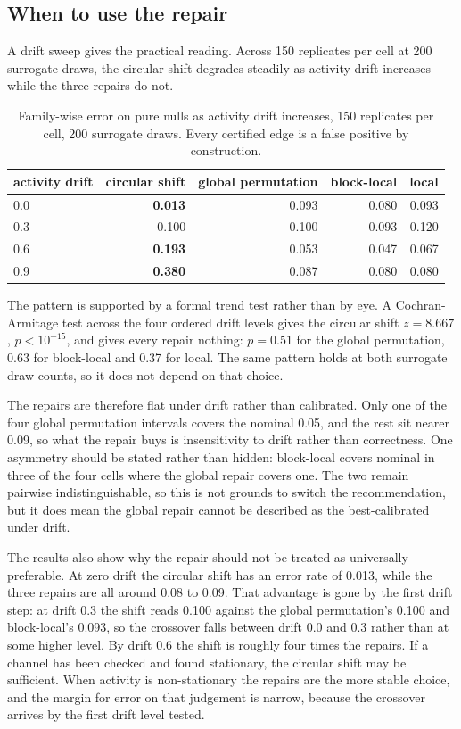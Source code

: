 \documentclass[10pt]{article}
\begin{document}
\subsection{When to use the repair}

A drift sweep gives the practical reading. Across 150 replicates per cell at 200 surrogate draws,
the circular shift degrades steadily as activity drift increases while the three repairs do not.

\begin{table}[h]
\centering
\begin{tabular}{lrrrr}
\toprule
activity drift & circular shift & global permutation & block-local & local \\
\midrule
0.0 & \textbf{0.013} & 0.093 & 0.080 & 0.093 \\
0.3 & 0.100 & 0.100 & 0.093 & 0.120 \\
0.6 & \textbf{0.193} & 0.053 & 0.047 & 0.067 \\
0.9 & \textbf{0.380} & 0.087 & 0.080 & 0.080 \\
\bottomrule
\end{tabular}
\caption{Family-wise error on pure nulls as activity drift increases, 150 replicates per cell, 200
surrogate draws. Every certified edge is a false positive by construction.}
\end{table}

The pattern is supported by a formal trend test rather than by eye. A Cochran-Armitage test across
the four ordered drift levels gives the circular shift $z = 8.667$, $p < 10^{-15}$, and gives every
repair nothing: $p = 0.51$ for the global permutation, 0.63 for block-local and 0.37 for local. The
same pattern holds at both surrogate draw counts, so it does not depend on that choice.

The repairs are therefore flat under drift rather than calibrated. Only one of the four global
permutation intervals covers the nominal 0.05, and the rest sit nearer 0.09, so what the repair buys
is insensitivity to drift rather than correctness. One asymmetry should be stated rather than
hidden: block-local covers nominal in three of the four cells where the global repair covers one.
The two remain pairwise indistinguishable, so this is not grounds to switch the recommendation, but
it does mean the global repair cannot be described as the best-calibrated under drift.

The results also show why the repair should not be treated as universally preferable. At zero drift
the circular shift has an error rate of 0.013, while the three repairs are all around 0.08 to 0.09.
That advantage is gone by the first drift step: at drift 0.3 the shift reads 0.100 against the global
permutation's 0.100 and block-local's 0.093, so the crossover falls between drift 0.0 and 0.3 rather
than at some higher level. By drift 0.6 the shift is roughly four times the repairs. If a channel has
been checked and found stationary, the circular shift may be sufficient. When activity is
non-stationary the repairs are the more stable choice, and the margin for error on that judgement is
narrow, because the crossover arrives by the first drift level tested.
\end{document}
